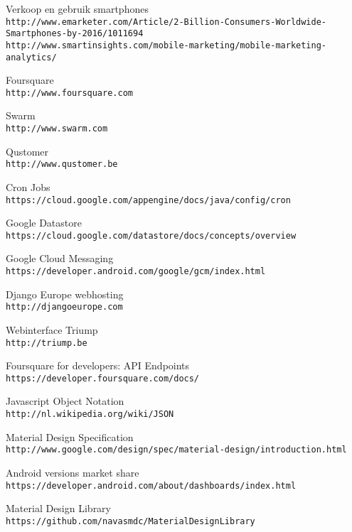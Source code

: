 \begin{thebibliography}{9}

Verkoop en gebruik smartphones
\\\texttt{http://www.emarketer.com/Article/2-Billion-Consumers-Worldwide-Smartphones-by-2016/1011694}
\\\texttt{http://www.smartinsights.com/mobile-marketing/mobile-marketing-analytics/}

Foursquare
\\\texttt{http://www.foursquare.com}

Swarm
\\\texttt{http://www.swarm.com}

Qustomer
\\\texttt{http://www.qustomer.be}

Cron Jobs
\\\texttt{https://cloud.google.com/appengine/docs/java/config/cron}

Google Datastore
\\\texttt{https://cloud.google.com/datastore/docs/concepts/overview}

Google Cloud Messaging
\\\texttt{https://developer.android.com/google/gcm/index.html}

Django Europe webhosting
\\\texttt{http://djangoeurope.com}

Webinterface Triump
\\\texttt{http://triump.be}

Foursquare for developers: API Endpoints
\\\texttt{https://developer.foursquare.com/docs/}

Javascript Object Notation
\\\texttt{http://nl.wikipedia.org/wiki/JSON}

Material Design Specification
\\\texttt{http://www.google.com/design/spec/material-design/introduction.html}

Android versions market share
\\\texttt{https://developer.android.com/about/dashboards/index.html}

Material Design Library
\\\texttt{https://github.com/navasmdc/MaterialDesignLibrary}


\end{thebibliography}

